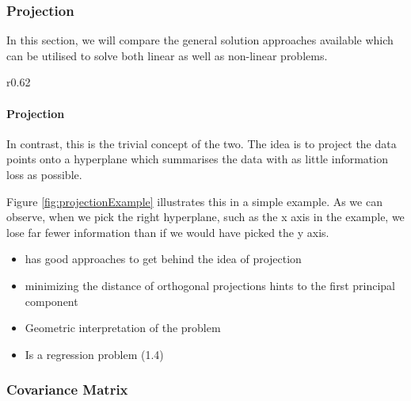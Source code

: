 \subsubsection{Projection}



In this section, we will compare the general solution approaches available which can be utilised to solve both linear as well as non-linear problems. \cite{HandsOnMLCh8}


\renewcommand{\tikzscale}{0.33}
\begin{wrapfigure}[13]{r}{0.62\textwidth}
	\vspace*{-8mm}
	\centering
	
	\captionsetup{justification=centering}
	\caption{Simple example of a projection}
    \label{fig:projectionExample}
\end{wrapfigure}

\paragraph{Projection} In contrast, this is the trivial concept of the two. The idea is to project the data points onto a \gls{hyperplane} which summarises the data with as little information loss as possible.

Figure \ref{fig:projectionExample} illustrates this in a simple example.
As we can observe, when we pick the right \gls{hyperplane}, such as the x axis in the example, we lose far fewer information than if we would have picked the y axis.



\begin{itemize}
	\item \cite{tarpey1999self} has good approaches to get behind the idea of projection
	\item minimizing the distance of orthogonal projections hints to the first principal component
	\item Geometric interpretation of the problem 
	\item Is a regression problem \cite{brunton2019data} (1.4)
\end{itemize}




\clearpage



\subsubsection{Covariance Matrix}

